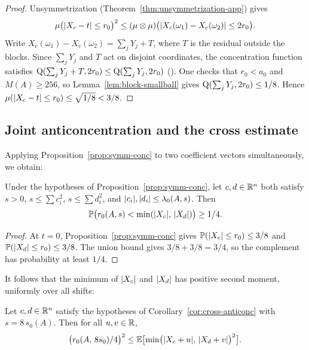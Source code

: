 \begin{proof}
Unsymmetrization (Theorem~\ref{thm:unsymmetrization-app}) gives
\[
\mu\bigl(\lvert X_c - t \rvert \le r_0\bigr)^2
\le
(\mu \otimes \mu)
\bigl(\lvert X_c(\omega_1) - X_c(\omega_2) \rvert \le 2r_0\bigr).
\]
Write $X_c(\omega_1) - X_c(\omega_2) = \sum_j Y_j + T$, where $T$
is the residual outside the blocks. Since $\sum_j Y_j$ and $T$ act
on disjoint coordinates, the concentration function satisfies
$\operatorname{Q}(\sum_j Y_j + T, 2r_0) \le \operatorname{Q}(\sum_j Y_j, 2r_0)$
().
One checks that $r_0 < a_0$ and
$M(A) \ge 256$, so Lemma~\ref{lem:block-smallball} gives
$\operatorname{Q}(\sum_j Y_j, 2r_0) \le 1/8$. Hence
$\mu(\lvert X_c - t \rvert \le r_0) \le \sqrt{1/8} < 3/8$.
\end{proof}

\subsection{Joint anticoncentration and the cross estimate}

Applying Proposition~\ref{prop:symm-conc} to two coefficient vectors
simultaneously, we obtain:

\begin{corollary}\label{cor:cross-anticonc}
Under the hypotheses of Proposition~\ref{prop:symm-conc}, let
$c, d \in \mathbb{R}^n$ both satisfy $s > 0$, $s \le \sum c_i^2$,
$s \le \sum d_i^2$, and
$\lvert c_i \rvert, \lvert d_i \rvert \le \lambda_0(A,s)$. Then
\[
\mathbb{P}\bigl(r_0(A,s)
  < \min(\lvert X_c \rvert,\,\lvert X_d \rvert)\bigr)
\ge 1/4.
\]
\end{corollary}

\begin{proof}
At $t = 0$, Proposition~\ref{prop:symm-conc} gives
$\mathbb{P}(\lvert X_c \rvert \le r_0) \le 3/8$ and
$\mathbb{P}(\lvert X_d \rvert \le r_0) \le 3/8$.
The union bound gives $3/8 + 3/8 = 3/4$, so the complement has
probability at least $1/4$.
\end{proof}

It follows that the minimum of $\lvert X_c \rvert$ and $\lvert X_d \rvert$ has positive
second moment, uniformly over all shifts:

\begin{lemma}\label{lem:cross-min-sq}
Let $c, d \in \mathbb{R}^n$ satisfy the hypotheses of
Corollary~\ref{cor:cross-anticonc} with $s = 8\,s_0(A)$.
Then for all $u, v \in \mathbb{R}$,
\[
\bigl(r_0(A,\, 8s_0)/4\bigr)^2
\le
\mathbb{E}\bigl[\min\bigl(\lvert X_c + u \rvert,\,
  \lvert X_d + v \rvert\bigr)^2\bigr].
\]
\end{lemma}

